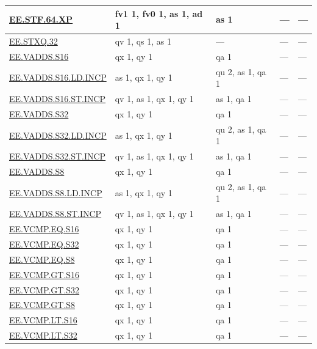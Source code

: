 \begin{longtable}[c]{|l|m{2.5cm}|m{2.5cm}|m{2.5cm}|m{2.5cm}|}
    \hyperref[instruction:EESTF64XP]{EE.STF.64.XP} & fv1 1, fv0 1, as 1, ad 1 & as 1 & — & — \\\hline
    \hyperref[instruction:EESTXQ32]{EE.STXQ.32} & qv 1, qs 1, as 1 & — & — & — \\\hline
    \hyperref[instruction:EEVADDSS16]{EE.VADDS.S16} & qx 1, qy 1 & qa 1 & — & — \\\hline
    \hyperref[instruction:EEVADDSS16LDINCP]{EE.VADDS.S16.LD.INCP} & as 1, qx 1, qy 1 & qu 2, as 1, qa 1 & — & — \\\hline
    \hyperref[instruction:EEVADDSS16STINCP]{EE.VADDS.S16.ST.INCP} & qv 1, as 1, qx 1, qy 1 & as 1, qa 1 & — & — \\\hline
    \hyperref[instruction:EEVADDSS32]{EE.VADDS.S32} & qx 1, qy 1 & qa 1 & — & — \\\hline
    \hyperref[instruction:EEVADDSS32LDINCP]{EE.VADDS.S32.LD.INCP} & as 1, qx 1, qy 1 & qu 2, as 1, qa 1 & — & — \\\hline
    \hyperref[instruction:EEVADDSS32STINCP]{EE.VADDS.S32.ST.INCP} & qv 1, as 1, qx 1, qy 1 & as 1, qa 1 & — & — \\\hline
    \hyperref[instruction:EEVADDSS8]{EE.VADDS.S8} & qx 1, qy 1 & qa 1 & — & — \\\hline
    \hyperref[instruction:EEVADDSS8LDINCP]{EE.VADDS.S8.LD.INCP} & as 1, qx 1, qy 1 & qu 2, as 1, qa 1 & — & — \\\hline
    \hyperref[instruction:EEVADDSS8STINCP]{EE.VADDS.S8.ST.INCP} & qv 1, as 1, qx 1, qy 1 & as 1, qa 1 & — & — \\\hline
    \hyperref[instruction:EEVCMPEQS16]{EE.VCMP.EQ.S16} & qx 1, qy 1 & qa 1 & — & — \\\hline
    \hyperref[instruction:EEVCMPEQS32]{EE.VCMP.EQ.S32} & qx 1, qy 1 & qa 1 & — & — \\\hline
    \hyperref[instruction:EEVCMPEQS8]{EE.VCMP.EQ.S8} & qx 1, qy 1 & qa 1 & — & — \\\hline
    \hyperref[instruction:EEVCMPGTS16]{EE.VCMP.GT.S16} & qx 1, qy 1 & qa 1 & — & — \\\hline
    \hyperref[instruction:EEVCMPGTS32]{EE.VCMP.GT.S32} & qx 1, qy 1 & qa 1 & — & — \\\hline
    \hyperref[instruction:EEVCMPGTS8]{EE.VCMP.GT.S8} & qx 1, qy 1 & qa 1 & — & — \\\hline
    \hyperref[instruction:EEVCMPLTS16]{EE.VCMP.LT.S16} & qx 1, qy 1 & qa 1 & — & — \\\hline
    \hyperref[instruction:EEVCMPLTS32]{EE.VCMP.LT.S32} & qx 1, qy 1 & qa 1 & — & — \\\hline

\end{longtable}
